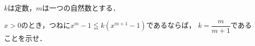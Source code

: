 \documentclass[../../main.tex]{subfiles}
\begin{document}
$k$は定数，$m$は一つの自然数とする．

$x>0$のとき，つねに$x^m-1 \leqq k(x^{m+1}-1)$であるならば，
$\displaystyle k=\dfrac{m}{m+1}$であることを示せ．
\end{document}
